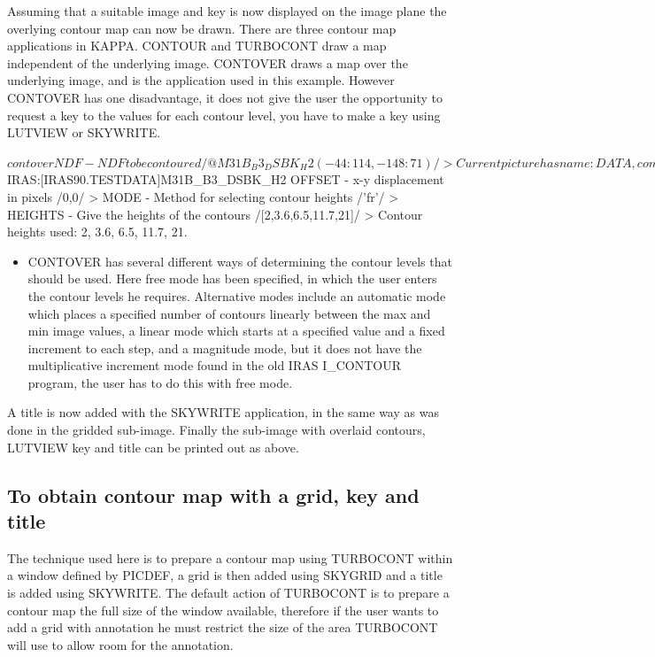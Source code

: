 \documentclass[twoside,11pt]{starlink}
\begin{document}
Assuming that a suitable image and key is now displayed on the image plane
the overlying contour map can now be drawn. There are three contour map
applications in KAPPA. CONTOUR and TURBOCONT draw a map independent of the
underlying image. CONTOVER draws a map over the underlying image, and is the
application used in this example. However CONTOVER has one
disadvantage, it does not give the user the opportunity to request a key to the
values for each contour level, you have to make a key using LUTVIEW or SKYWRITE.
\begin{small}
\begin{terminalv}
$ contover
NDF - NDF to be contoured /@M31B_B3_DSBK_H2(-44:114,-148:71)/ >
Current picture has name: DATA, comment: KAPPA_DISPLAY.
   Reference data object: DISK$IRAS:[IRAS90.TESTDATA]M31B_B3_DSBK_H2
OFFSET - x-y displacement in pixels /0,0/ >
MODE - Method for selecting contour heights /'fr'/ >
HEIGHTS - Give the heights of the contours /[2,3.6,6.5,11.7,21]/ >
Contour heights used:
2,   3.6,   6.5,   11.7,   21.
\end{terminalv}
\end{small}
\begin{itemize}
\item CONTOVER  has several different ways of determining the contour
levels that should be used. Here free mode has been specified, in which the
user enters the contour levels he requires. Alternative modes include an
automatic mode which places a specified number of contours linearly between the
max and min image values, a linear mode which starts at a specified value and
a fixed increment to each step, and a magnitude mode, but it does not have the
multiplicative increment mode found in the old IRAS I\_CONTOUR program, the user
has to do this with free mode.
\end{itemize}
A title is now added with the SKYWRITE application, in the same way as was done
in the gridded sub-image. Finally the sub-image with overlaid contours, LUTVIEW
key and title can be printed out as above.

\subsection{To obtain contour map with a grid, key and title}
\label{k:contour}
The technique used here is to prepare a contour map using TURBOCONT within a
window defined by PICDEF, a grid is then added using SKYGRID and a title is
added using SKYWRITE. The default action of TURBOCONT is to prepare a contour
map the full size of the window available, therefore if the user wants to add
a grid with annotation he must restrict the size of the area TURBOCONT will
use to allow room for the annotation.
\end{document}
